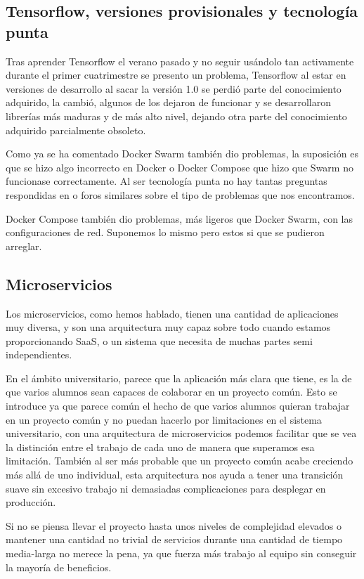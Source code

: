 \subsection{Tensorflow, versiones provisionales y tecnología punta}

Tras aprender Tensorflow el verano pasado y no seguir usándolo tan activamente durante el primer cuatrimestre se presento un problema, Tensorflow al estar en versiones de desarrollo al sacar la versión 1.0 se perdió parte del conocimiento adquirido, la  cambió, algunos de los  dejaron de funcionar y se desarrollaron librerías  más maduras y de más alto nivel, dejando otra parte del conocimiento adquirido parcialmente obsoleto.

Como ya se ha comentado Docker Swarm también dio problemas, la suposición es que se hizo algo incorrecto en Docker o Docker Compose que hizo que Swarm no funcionase correctamente. Al ser tecnología punta no hay tantas preguntas respondidas en  o foros similares sobre el tipo de problemas que nos encontramos.

Docker Compose también dio problemas, más ligeros que Docker Swarm, con las configuraciones de red.
Suponemos lo mismo pero estos si que se pudieron arreglar.


\subsection{Microservicios}

Los microservicios, como hemos hablado, tienen una cantidad de aplicaciones muy diversa, y son una arquitectura muy capaz sobre todo cuando estamos proporcionando SaaS, o un sistema que necesita de muchas partes semi independientes. 

En el ámbito universitario, parece que la aplicación más clara que tiene, es la de que varios alumnos sean capaces de colaborar en un proyecto común. Esto se introduce ya que parece común el hecho de que varios alumnos quieran trabajar en un proyecto común y no puedan hacerlo por limitaciones en el sistema universitario, con una arquitectura de microservicios podemos facilitar que se vea la distinción entre el trabajo de cada uno de manera que superamos esa limitación. También al ser más probable que un proyecto común acabe creciendo más allá de uno individual, esta arquitectura nos ayuda a tener una transición suave sin excesivo trabajo ni demasiadas complicaciones para desplegar en producción.

Si no se piensa llevar el proyecto hasta unos niveles de complejidad elevados o mantener una cantidad no trivial de servicios durante una cantidad de tiempo media-larga no merece la pena, ya que fuerza más trabajo al equipo sin conseguir la mayoría de beneficios.